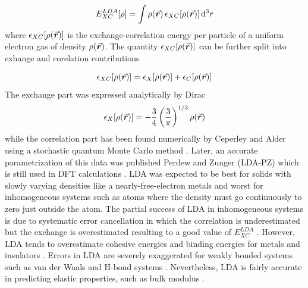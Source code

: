 \begin{equation} \label{eq:LDA-XC}
	E^{LDA}_{XC} [\rho]= \int \rho({\va*{r}}) \,\epsilon_{XC}[\rho({\va*{r}}) ] \dd[3]{r}
\end{equation}
where $\epsilon_{XC}[\rho({\va*{r}}) ]$ is the exchange-correlation energy per particle of a uniform electron gas of density $\rho({\va*{r}})$. The quantity $\epsilon_{XC}[\rho({\va*{r}}) ]$ can be further split into exhange and corelation contributions

\begin{equation}
	\epsilon_{XC}[\rho({\va*{r}}) ] = \epsilon_{X}[\rho({\va*{r}}) ] + \epsilon_{C}[\rho({\va*{r}})]
\end{equation}
The exchange part was expressed analytically by Dirac \citep{Dirac1930}
\begin{equation}
	\epsilon_{X}[\rho({\va*{r}}) ] = - \frac{3}{4} \left( \frac{3}{\pi} \right)^{1/3} \rho({\va*{r}})
\end{equation}
while the correlation part has been found  numerically by Ceperley and Alder \citep{Ceperley1980} using a stochastic quantum Monte Carlo method \citep{Foulkes2001}. Later, an accurate parametrization of this data was published Perdew and Zunger (LDA-PZ) which is still used in DFT calculations \citep{Perdew1981}. LDA was expected to be best for solids with slowly varying densities like  a nearly-free-electron metals and worst for inhomogeneous systems such as atoms where the density must go continuously to zero just outside the atom. The partial success of LDA in inhomogeneous systems is due to systematic error cancellation in which the correlation is underestimated  but the exchange is overestimated resulting to a good value of $E^{LDA}_{XC}$ \citep{Gunnarsson1976,Gunnarsson1977}. However, LDA tends to overestimate cohesive energies and binding energies for metals and insulators \citep{Staroverov2004,Csonka2009,Harl2010}. Errors in LDA are severely exaggerated for weakly bonded systems such as van der Waals and H-bond systems \citep{Lee1993,Hamann1997,Feibelman2008}. Nevertheless, LDA is fairly accurate in predicting elastic properties, such as bulk modulus \citep{Froyen1983,Tan2012}.


